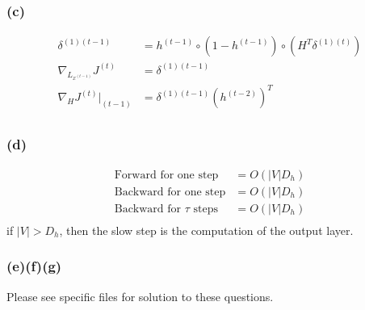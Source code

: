 \documentclass{article}
\begin{document}
\subsubsection*{(c)}
\begin{align*}
\delta^{(1)(t-1)} &= h^{(t-1)} \circ (1 - h^{(t-1)}) \circ (H^T \delta^{(1)(t)}) \\
\nabla_{L_{x^{(t-1)}}} J^{(t)} &= \delta^{(1)(t-1)} \\
\nabla_{H} J^{(t)} \big|_{(t-1)} &= \delta^{(1)(t-1)} (h^{(t-2)})^T \\
\end{align*}
\subsubsection*{(d)}
\begin{align*}
\text{Forward for one step} &= O(|V| D_h) \\
\text{Backward for one step} &= O(|V| D_h)\\
\text{Backward for $\tau$ steps} &= O(|V| D_h)\\
\end{align*}
if $|V| > D_h$, then the slow step is the computation of the output layer.
\subsubsection*{(e)(f)(g)}
Please see specific files for solution to these questions.\\
\end{document}
